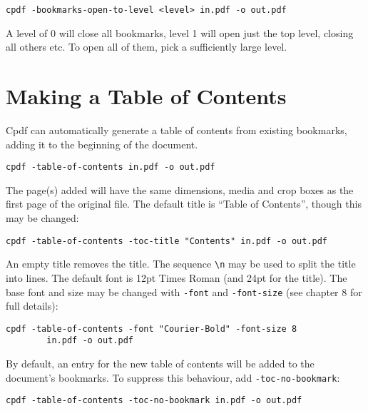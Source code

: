 \documentclass{book}
\begin{document}
  \begin{framed}
   \small\verb!cpdf -bookmarks-open-to-level <level> in.pdf -o out.pdf!
  \end{framed}

\noindent A level of 0 will close all bookmarks, level 1 will open just the top level, closing all others etc. To open all of them, pick a sufficiently large level.


\section{Making a Table of Contents}

Cpdf can automatically generate a table of contents from existing bookmarks, adding it to the beginning of the document.

  \begin{framed}
   \small\verb!cpdf -table-of-contents in.pdf -o out.pdf!
  \end{framed}

The page(s) added will have the same dimensions, media and crop boxes as the first page of the original file. The default title is ``Table of Contents'', though this may be changed:

  \begin{framed}
   \small\verb!cpdf -table-of-contents -toc-title "Contents" in.pdf -o out.pdf!
  \end{framed}

An empty title removes the title. The sequence \texttt{\textbackslash n} may be used to split the title into lines. The default font is 12pt Times Roman (and 24pt for the title). The base font and size may be changed with \texttt{-font} and \texttt{-font-size} (see chapter 8 for full details):

  \begin{framed}
   \small\verb!cpdf -table-of-contents -font "Courier-Bold" -font-size 8!\\
   \small\verb!        in.pdf -o out.pdf!
  \end{framed}

By default, an entry for the new table of contents will be added to the document's bookmarks. To suppress this behaviour, add \texttt{-toc-no-bookmark}:

  \begin{framed}
   \small\verb!cpdf -table-of-contents -toc-no-bookmark in.pdf -o out.pdf!
  \end{framed}
\end{document}
